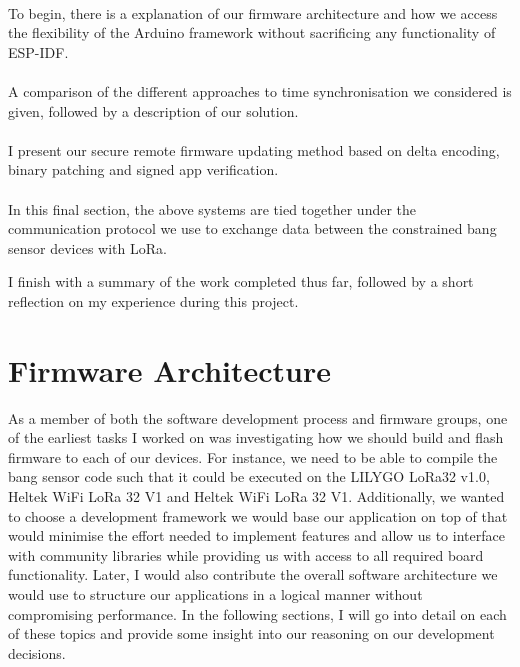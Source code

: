 \documentclass[conference]{IEEEtran}
\begin{document}
\paragraph{} To begin, there is a explanation of our firmware architecture and how we access the flexibility of the Arduino framework without sacrificing any functionality of ESP-IDF.
\paragraph{} A comparison of the different approaches to time synchronisation we considered is given, followed by a description of our solution.
\paragraph{} I present our secure remote firmware updating method based on delta encoding, binary patching and signed app verification.
\paragraph{} In this final section, the above systems are tied together under the communication protocol we use to exchange data between the constrained bang sensor devices with LoRa.

I finish with a summary of the work completed thus far, followed by a short reflection on my experience during this project.



\section{Firmware Architecture} \label{architecture}

As a member of both the software development process and firmware groups, one of the earliest tasks I worked on was investigating how we should build and flash firmware to each of our devices. For instance, we need to be able to compile the bang sensor code such that it could be executed on the LILYGO LoRa32 v1.0, Heltek WiFi LoRa 32 V1 and Heltek WiFi LoRa 32 V1. Additionally, we wanted to choose a development framework we would base our application on top of that would minimise the effort needed to implement features and allow us to interface with community libraries while providing us with access to all required board functionality. Later, I would also contribute the overall software architecture we would use to structure our applications in a logical manner without compromising performance. In the following sections, I will go into detail on each of these topics and provide some insight into our reasoning on our development decisions.
\end{document}
